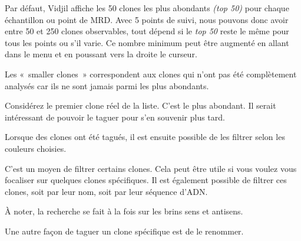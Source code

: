 \documentclass[11pt]{article}
\begin{document}
Par défaut, Vidjil affiche les 50 clones les plus abondants \textit{(top 50)}
pour chaque échantillon ou point de MRD. Avec 5 points de suivi, nous
pouvons donc avoir entre 50 et 250 clones observables, tout dépend si le
\textit{top 50} reste le même pour tous les points ou s'il varie. Ce nombre
minimum peut être augmenté en allant dans le menu  et en
poussant vers la droite le curseur.

 Les «~smaller clones~» correspondent aux clones qui n'ont
  pas été complètement analysés car ils ne sont jamais parmi les plus abondants.

\bigskip

Considérez le premier  clone réel de la liste. C'est le plus abondant. Il
serait intéressant de pouvoir le taguer pour s'en souvenir plus tard.


Lorsque des clones ont été tagués, il est ensuite possible de
les filtrer selon les couleurs choisies.


C'est un moyen de filtrer certains clones. Cela peut être utile si vous
voulez vous focaliser sur quelques clones spécifiques. Il est également
possible de filtrer ces clones, soit par leur nom, soit par leur séquence
d'ADN.

À noter, la recherche se fait à la fois sur les brins sens
  et antisens.

\bigskip

Une autre façon de taguer un clone spécifique est de le renommer.

\end{document}
